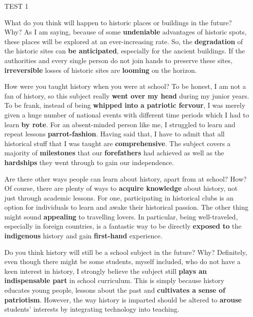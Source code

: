 \begin{glossarymc}[Cambridge 4]
\begin{test}{TEST 1}
	\begin{qa}{What do you think will happen to historic places or buildings in the future? Why?}
	As I am saying, because of some \textbf{undeniable} advantages of historic spots, these places will be explored at an ever-increasing rate. So, the \textbf{degradation} of the historic sites can \textbf{be anticipated}, especially for the ancient buildings. If the authorities and every single person do not join hands to preserve these sites, \textbf{irreversible} losses of historic sites are \textbf{looming} on the horizon.
	\end{qa}

	\begin{qa}{How were you taught history when you were at school?}
	To be honest, I am not a fan of history, so this subject really \textbf{went over my head} during my junior years. To be frank, instead of being \textbf{whipped into a patriotic fervour}, I was merely given a huge number of national events with different time periods which I had to learn \textbf{by rote}. For an absent-minded person like me, I struggled to learn and repeat lessons \textbf{parrot-fashion}. Having said that, I have to admit that all historical stuff that I was taught are \textbf{comprehensive}. The subject covers a majority of \textbf{milestones} that our \textbf{forefathers} had achieved as well as the \textbf{hardships} they went through to gain our independence.
	\end{qa}

	\begin{qa}{Are there other ways people can learn about history, apart from at school? How?}
	Of course, there are plenty of ways to \textbf{acquire knowledge} about history, not just through academic lessons. For one, participating in historical clubs is an option for individuals to learn and awake their historical passion. The other thing might sound \textbf{appealing} to travelling lovers. In particular, being well-traveled, especially in foreign countries, is a fantastic way to be directly \textbf{exposed to} the \textbf{indigenous} history and gain \textbf{first-hand} experience.
	\end{qa}

	\begin{qa}{Do you think history will still be a school subject in the future? Why?}
	Definitely, even though there might be some students, myself included, who do not have a keen interest in history, I strongly believe the subject still \textbf{plays an indispensable part} in school curriculum. This is simply because history educates young people, lessons about the past and \textbf{cultivates a sense of patriotism}. However, the way history is imparted should be altered to \textbf{arouse} students' interests by integrating technology into teaching.
	\end{qa}


\end{test}
\end{glossarymc}
